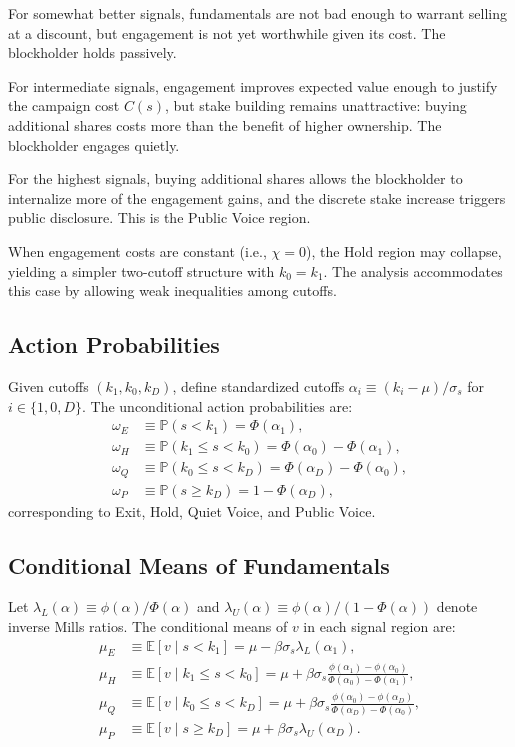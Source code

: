 \documentclass[11pt]{article}
\newcommand{\E}{\mathbb{E}}
\newcommand{\PP}{\mathbb{P}}
\newcommand{\1}{\mathbf{1}}
\begin{document}
For somewhat better signals, fundamentals are not bad enough to warrant selling at a discount, but engagement is not yet worthwhile given its cost. The blockholder holds passively.

For intermediate signals, engagement improves expected value enough to justify the campaign cost $C(s)$, but stake building remains unattractive: buying additional shares costs more than the benefit of higher ownership. The blockholder engages quietly.

For the highest signals, buying additional shares allows the blockholder to internalize more of the engagement gains, and the discrete stake increase triggers public disclosure. This is the Public Voice region.

When engagement costs are constant (i.e., $\chi=0$), the Hold region may collapse, yielding a simpler two-cutoff structure with $k_0=k_1$. The analysis accommodates this case by allowing weak inequalities among cutoffs.

%
\subsection{Action Probabilities}
%

Given cutoffs $(k_1, k_0, k_D)$, define standardized cutoffs $\alpha_i \equiv (k_i - \mu)/\sigma_s$ for $i \in \{1, 0, D\}$. The unconditional action probabilities are:
\begin{align*}
\omega_E &\equiv \PP(s < k_1) = \Phi(\alpha_1), \\
\omega_H &\equiv \PP(k_1 \leq s < k_0) = \Phi(\alpha_0) - \Phi(\alpha_1), \\
\omega_Q &\equiv \PP(k_0 \leq s < k_D) = \Phi(\alpha_D) - \Phi(\alpha_0), \\
\omega_P &\equiv \PP(s \geq k_D) = 1 - \Phi(\alpha_D),
\end{align*}
corresponding to Exit, Hold, Quiet Voice, and Public Voice.

%
\subsection{Conditional Means of Fundamentals}
%

Let $\lambda_L(\alpha) \equiv \phi(\alpha)/\Phi(\alpha)$ and $\lambda_U(\alpha) \equiv \phi(\alpha)/(1-\Phi(\alpha))$ denote inverse Mills ratios. The conditional means of $v$ in each signal region are:
\begin{align*}
\mu_E &\equiv \E[v \mid s < k_1] = \mu - \beta\sigma_s \lambda_L(\alpha_1), \\
\mu_H &\equiv \E[v \mid k_1 \leq s < k_0] = \mu + \beta\sigma_s \frac{\phi(\alpha_1) - \phi(\alpha_0)}{\Phi(\alpha_0) - \Phi(\alpha_1)}, \\
\mu_Q &\equiv \E[v \mid k_0 \leq s < k_D] = \mu + \beta\sigma_s \frac{\phi(\alpha_0) - \phi(\alpha_D)}{\Phi(\alpha_D) - \Phi(\alpha_0)}, \\
\mu_P &\equiv \E[v \mid s \geq k_D] = \mu + \beta\sigma_s \lambda_U(\alpha_D).
\end{align*}
\end{document}
